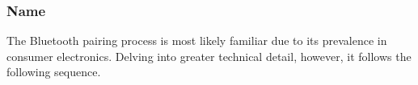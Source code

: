 \subsubsection{Name}



The Bluetooth pairing process is most likely familiar due to its prevalence in
consumer electronics. Delving into greater technical detail, however, it follows
the following sequence.

